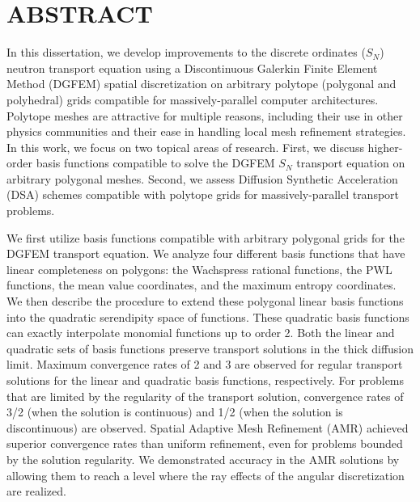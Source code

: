 %
%
%

\chapter*{ABSTRACT}

\pagestyle{plain} %
\setcounter{page}{2}

\indent In this dissertation, we develop improvements to the discrete ordinates ($S_N$) neutron transport equation using a Discontinuous Galerkin Finite Element Method (DGFEM) spatial discretization on arbitrary polytope (polygonal and polyhedral) grids compatible for massively-parallel computer architectures. Polytope meshes are attractive for multiple reasons, including their use in other physics communities and their ease in handling local mesh refinement strategies. In this work, we focus on two topical areas of research. First, we discuss higher-order basis functions compatible to solve the DGFEM $S_N$ transport equation on arbitrary polygonal meshes. Second, we assess Diffusion Synthetic Acceleration (DSA) schemes compatible with polytope grids for massively-parallel transport problems.

We first utilize basis functions compatible with arbitrary polygonal grids for the DGFEM transport equation. We analyze four different basis functions that have linear completeness on polygons: the Wachspress rational functions, the PWL functions, the mean value coordinates, and the maximum entropy coordinates. We then describe the procedure to extend these polygonal linear basis functions into the quadratic serendipity space of functions. These quadratic basis functions can exactly interpolate monomial functions up to order 2. Both the linear and quadratic sets of basis functions preserve transport solutions in the thick diffusion limit. Maximum convergence rates of 2 and 3 are observed for regular transport solutions for the linear and quadratic basis functions, respectively. For problems that are limited by the regularity of the transport solution, convergence rates of 3/2 (when the solution is continuous) and 1/2 (when the solution is discontinuous) are observed. Spatial Adaptive Mesh Refinement (AMR) achieved superior convergence rates than uniform refinement, even for problems bounded by the solution regularity. We demonstrated accuracy in the AMR solutions by allowing them to reach a level where the ray effects of the angular discretization are realized.

